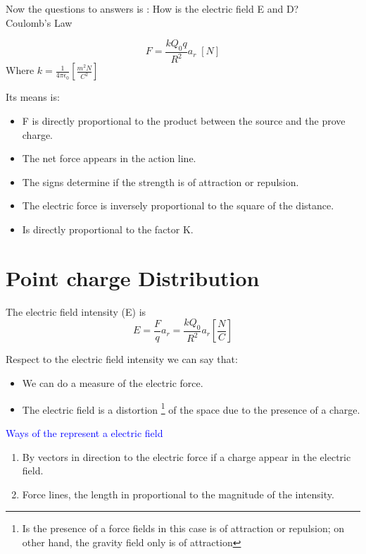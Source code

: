 \documentclass[12pt,letterpaper]{book}
\begin{document}
Now the questions to answers is : How is the electric field E and D?\\

\large{Coulomb's  Law }

\begin{equation}
F=\frac{kQ_0 q}{R^2}a_r\; [N]
\end{equation}
Where $k=\frac{1}{4\pi \epsilon _0}\left[\frac{m^2N}{C^2}\right] $

Its means is:

\begin{itemize}
\item F is directly proportional to the product between the source and the prove charge.
\item The net force appears in the action line.
\item The signs determine if the strength is of attraction or repulsion.
\item The electric force is inversely proportional to the square of the distance.
\item Is directly proportional to the factor K.   
\end{itemize} 

\section{Point charge Distribution}

The electric field intensity (E) is
\begin{equation}
E=\frac{F}{q}a_r=\frac{kQ_0}{R^2}a_r \left[\frac{N}{C}\right]
\end{equation}

Respect to the electric field intensity we can say that:
\begin{itemize}
\item We can do a  measure of the electric force.
\item The electric field is a distortion \footnote{Is the presence of a force fields in this case is of attraction or repulsion; on other hand, the gravity field only is of attraction} of the space due to the presence of a charge.
\end{itemize}

\textcolor{blue}{ Ways of the represent a electric field}

\begin{enumerate}
\item By vectors in direction to the electric force if a charge appear in the electric field.
\item Force lines, the length in proportional to the magnitude of the intensity.
\end{enumerate}
\end{document}
